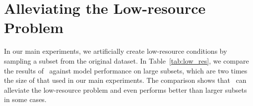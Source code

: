 \section{Alleviating the Low-resource Problem}

In our main experiments, we artificially create low-resource conditions by sampling a subset from the original dataset. In Table~\ref{tab:low_res}, we compare the results of \Methodnamec~against model performance on large subsets, which are two times the size of that used in our main experiments. 
The comparison shows that \Methodnamec~can alleviate the low-resource problem and even performs better than larger subsets in some cases. 





